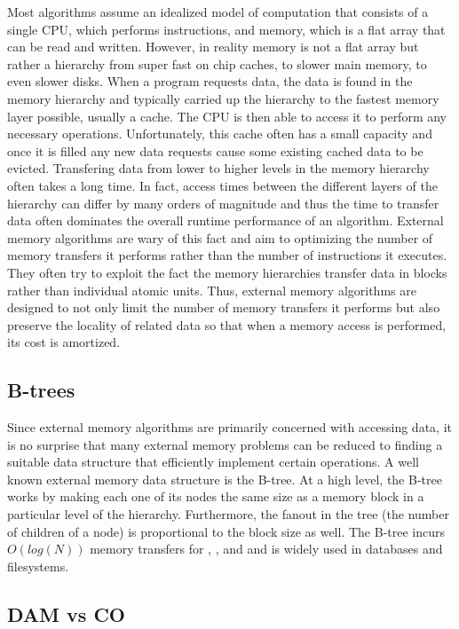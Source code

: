 \documentclass{style}
\begin{document}
Most algorithms assume an idealized model of computation that consists of a
single CPU, which performs instructions, and memory, which is a flat array
that can be read and written. However, in reality memory is not a flat array
but rather a hierarchy from super fast on chip caches, to slower main memory,
to even slower disks. When a program requests data, the data is found in the
memory hierarchy and typically carried up the hierarchy to the fastest memory
layer possible, usually a cache. The CPU is then able to access it to perform
any necessary operations. Unfortunately, this cache often has a small capacity
and once it is filled any new data requests cause some existing cached data to
be evicted. Transfering data from lower to higher levels in the memory
hierarchy often takes a long time. In fact, access times between the different
layers of the hierarchy can differ by many orders of magnitude and thus the
time to transfer data often dominates the overall runtime performance of an
algorithm. External memory algorithms are wary of this fact and aim to
optimizing the number of memory transfers it performs rather than the number
of instructions it executes. They often try to exploit the fact the memory
hierarchies transfer data in blocks rather than individual atomic units. Thus,
external memory algorithms are designed to not only limit the number of memory
transfers it performs but also preserve the locality of related data so that
when a memory access is performed, its cost is amortized.

\subsection{B-trees}

Since external memory algorithms are primarily concerned with accessing data,
it is no surprise that many external memory problems can be reduced to finding
a suitable data structure that efficiently implement certain operations. A
well known external memory data structure is the B-tree. At a high level, the
B-tree works by making each one of its nodes the same size as a memory block
in a particular level of the hierarchy. Furthermore, the fanout in the tree
(the number of children of a node) is proportional to the block size as well.
The B-tree incurs $O(log(N))$ memory transfers for \Search{}, \Insert{}, and
\Delete{} and is widely used in databases and filesystems.

\subsection{DAM vs CO}
\end{document}
